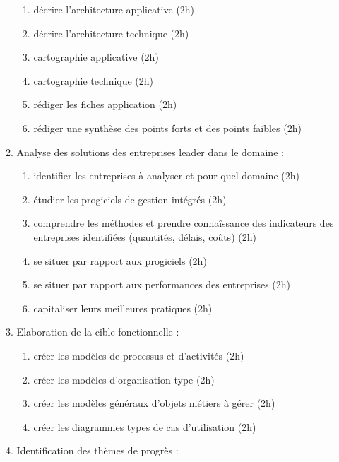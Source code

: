 \begin{enumerate}
\begin{enumerate}
\begin{enumerate}
                  \item décrire l'architecture applicative (2h)
                  \item décrire l'architecture technique (2h)
                  \item cartographie applicative (2h)
                  \item cartographie technique (2h)
                  \item rédiger les fiches application (2h)
                  \item rédiger une synthèse des points forts et des points faibles (2h)
                \end{enumerate}
            \item Analyse des solutions des entreprises leader dans le domaine : 
                \begin{enumerate}
                  \item identifier les entreprises à analyser et pour quel domaine (2h)
                  \item étudier les progiciels de gestion intégrés (2h)
                  \item comprendre les méthodes et prendre connaîssance des indicateurs des entreprises identifiées (quantités, délais, coûts) (2h)
                  \item se situer par rapport aux progiciels (2h)
                  \item se situer par rapport aux performances des entreprises (2h)
                  \item capitaliser leurs meilleures pratiques (2h)
                \end{enumerate}
            \item Elaboration de la cible fonctionnelle : 
                \begin{enumerate}
                  \item créer les modèles de processus et d'activités (2h)
                  \item créer les modèles d'organisation type (2h)
                  \item créer les modèles généraux d'objets métiers à gérer (2h)
                  \item créer les diagrammes types de cas d'utilisation (2h)
                \end{enumerate}
            \item Identification des thèmes de progrès : 
                \begin{enumerate}

\end{enumerate}
\end{enumerate}
\end{enumerate}
